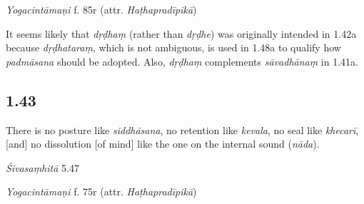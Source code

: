 \begin{ekdosis}
\begin{testimonia}[hp01_042]
\emph{Yogacintāmaṇi} f. 85r (attr. \emph{Haṭhapradīpikā})

\begin{versinnote}
\end{versinnote}


\end{testimonia}

\begin{philcomm}[hp01_042]
It seems likely that \emph{dṛḍhaṃ} (rather than \emph{dṛḍhe}) was originally intended in 1.42a because \emph{dṛḍhataraṃ}, which is not ambiguous, is used in 1.48a to qualify how \emph{padmāsana} should be adopted. Also, \emph{dṛḍhaṃ} complements \emph{sāvadhānaṃ} in 1.41a.
\end{philcomm}

\subsection*{1.43}
\begin{translation}[hp01_043]
There is no posture like \emph{siddhāsana}, no retention like \emph{kevala}, no seal like \emph{khecarī}, [and] no dissolution [of mind] like the one on the internal sound (\emph{nāda}).
\end{translation}

\begin{sources}[hp01_043]
\emph{Śivasaṃhitā} 5.47

\begin{versinnote}
\end{versinnote}

\end{sources}

\begin{testimonia}[hp01_043]
\emph{Yogacintāmaṇi} f. 75r (attr. \emph{Haṭhapradīpikā})


\end{testimonia}
\end{ekdosis}
